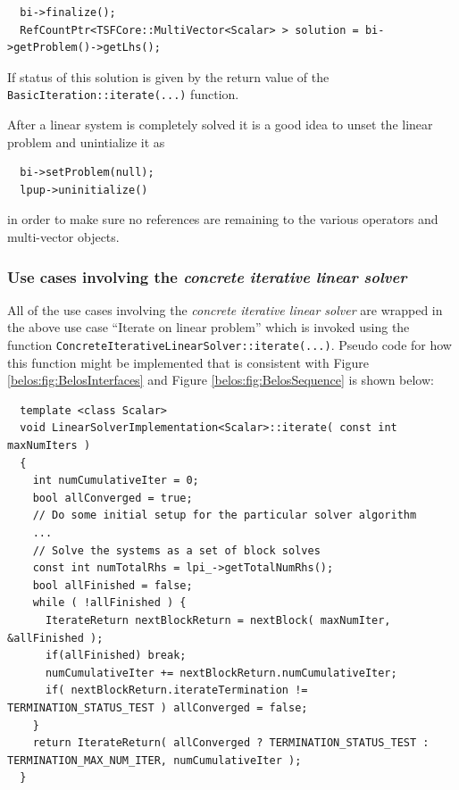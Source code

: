 \documentclass[pdf,ps2pdf,11pt]{SANDreport}
\begin{document}
\begin{enumerate}
{\scriptsize\begin{verbatim}
  bi->finalize();
  RefCountPtr<TSFCore::MultiVector<Scalar> > solution = bi->getProblem()->getLhs();
\end{verbatim}}

If status of this solution is given by the return value of the
{}\texttt{Basic\-Iteration::\-iterate(...)} function.

After a linear system is completely solved it is a good idea to unset the
linear problem and unintialize it as

{\scriptsize\begin{verbatim}
  bi->setProblem(null);
  lpup->uninitialize()
\end{verbatim}}

{}\noindent{}in order to make sure no references are remaining to the
various operators and multi-vector objects.

\end{enumerate}

\subsubsection*{Use cases involving the {}\textit{concrete iterative linear solver}}

All of the use cases involving the {}\textit{concrete iterative linear
solver} are wrapped in the above use case ``Iterate on linear
problem'' which is invoked using the function
{}\texttt{Concrete\-Iterative\-Linear\-Solver::\-iterate(...)}.
Pseudo code for how this function might be implemented that is
consistent with Figure {}\ref{belos:fig:BelosInterfaces} and Figure
{}\ref{belos:fig:BelosSequence} is shown below:

{\scriptsize\begin{verbatim}
  template <class Scalar>
  void LinearSolverImplementation<Scalar>::iterate( const int maxNumIters )
  { 
    int numCumulativeIter = 0;
    bool allConverged = true;
    // Do some initial setup for the particular solver algorithm
    ...
    // Solve the systems as a set of block solves
    const int numTotalRhs = lpi_->getTotalNumRhs();
    bool allFinished = false;
    while ( !allFinished ) {
      IterateReturn nextBlockReturn = nextBlock( maxNumIter, &allFinished );
      if(allFinished) break;
      numCumulativeIter += nextBlockReturn.numCumulativeIter;
      if( nextBlockReturn.iterateTermination != TERMINATION_STATUS_TEST ) allConverged = false;
    }
    return IterateReturn( allConverged ? TERMINATION_STATUS_TEST : TERMINATION_MAX_NUM_ITER, numCumulativeIter );
  }
\end{verbatim}}
\end{document}
